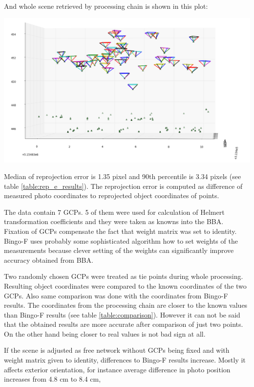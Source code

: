 \documentclass[a4paper,12pt]{article}
\begin{document}
And whole scene retrieved by processing chain is shown in this plot:

\includegraphics[scale=0.35]{figures/result_all.png}


Median of reprojection error is 1.35 pixel and 90th percentile is 3.34 pixels (see table \ref{table:rep_e_results}).
The reprojection error is computed as difference of measured photo coordinates to 
reprojected object coordinates of points. 

The data contain 7 GCPs. 5 of them were used for calculation of  Helmert transformation coefficients
and they were taken as knowns into the BBA. 
Fixation of GCPs compensate the fact that weight matrix was set to identity. 
Bingo-F uses probably some sophisticated algorithm how to set weights of the measurements because 
clever setting of the weights can significantly improve accuracy obtained from BBA.

Two randomly chosen GCPs were treated as tie points during whole processing. 
Resulting object coordinates were compared to the known coordinates of the two GCPs.
Also same comparison was done with the coordinates from Bingo-F results. 
The coordinates from the processing chain are closer to the known values 
than Bingo-F results (see table \ref{table:comparison}). 
However it can not be said that the obtained results 
are more accurate after comparison of just two points. On the other 
hand being closer to real values is  not bad sign at all.
 
If the scene is adjusted as free network without GCPs being fixed and with 
weight matrix given to identity, differences to Bingo-F results increase. 
Mostly it affects exterior orientation,
for instance average difference in photo position increases from 4.8 cm to 8.4 cm, 
\end{document}
